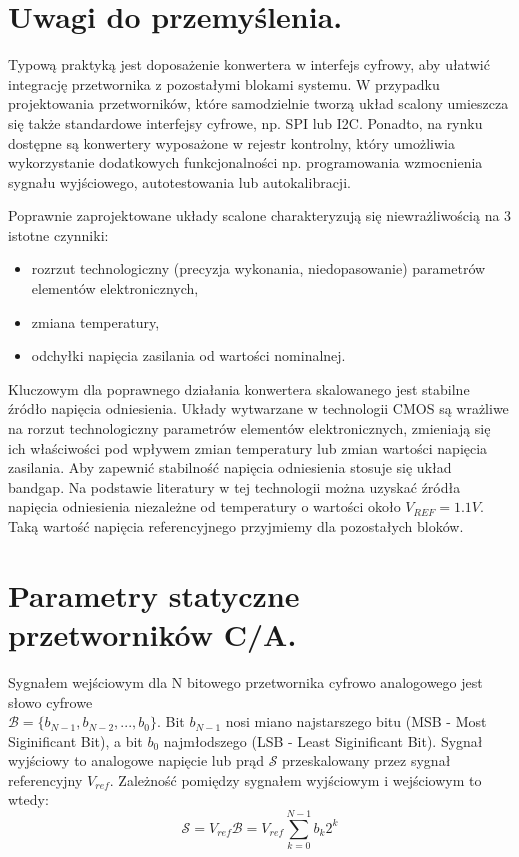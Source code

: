 \documentclass[10pt,a4paper]{report}
\theoremstyle{definition}
\theoremstyle{definition}
\theoremstyle{definition}
\theoremstyle{definition}
\theoremstyle{definition}
\begin{document}
\section{Uwagi do przemyślenia.}
{	Typową praktyką jest doposażenie konwertera w interfejs cyfrowy, aby ułatwić integrację przetwornika z pozostałymi blokami systemu. W przypadku projektowania przetworników, które samodzielnie tworzą układ scalony umieszcza się także standardowe interfejsy cyfrowe, np. SPI lub I2C. Ponadto, na rynku dostępne są konwertery wyposażone w rejestr kontrolny, który umożliwia wykorzystanie dodatkowych funkcjonalności np. programowania wzmocnienia sygnału wyjściowego, autotestowania lub autokalibracji. }

{	Poprawnie zaprojektowane układy scalone charakteryzują się niewrażliwością na 3 istotne czynniki:
	\begin{itemize}
		\item rozrzut technologiczny (precyzja wykonania, niedopasowanie) parametrów elementów elektronicznych,
		\item zmiana temperatury,
		\item odchyłki napięcia zasilania od wartości nominalnej.
	\end{itemize}
}
{	Kluczowym dla poprawnego działania konwertera skalowanego jest stabilne źródło napięcia odniesienia. Układy wytwarzane w technologii CMOS są wrażliwe na rorzut technologiczny parametrów elementów elektronicznych, zmieniają się ich właściwości pod wpływem zmian temperatury lub zmian wartości napięcia zasilania. Aby zapewnić stabilność napięcia odniesienia stosuje się układ bandgap. Na podstawie literatury w tej technologii można uzyskać źródła napięcia odniesienia niezależne od temperatury o wartości około $V_{REF}=1.1V$. Taką wartość napięcia referencyjnego przyjmiemy dla pozostałych bloków. }


	

	
	\section{Parametry statyczne przetworników C/A.}
	{	Sygnałem wejściowym dla N bitowego przetwornika cyfrowo analogowego jest słowo cyfrowe \\ $\mathcal{B}=\{b_{N-1},b_{N-2},...,b_0\}$. Bit $b_{N-1}$ nosi miano najstarszego bitu (MSB - Most Siginificant Bit), a bit $b_0$ najmłodszego (LSB - Least Siginificant Bit). Sygnał wyjściowy to analogowe napięcie lub prąd $\mathcal{S}$ przeskalowany przez sygnał referencyjny $V_{ref}$. Zależność pomiędzy sygnałem wyjściowym i wejściowym to wtedy:
	\begin{equation}
	\mathcal{S} = V_{ref}\mathcal{B} = V_{ref} {\sum_{k=0}^{N-1} b_k2^k}
	\end{equation}	}
	
\end{document}
